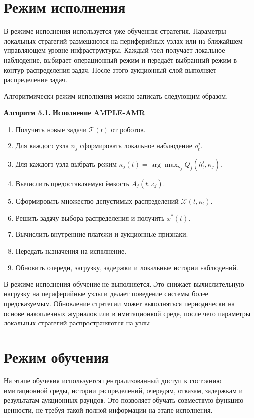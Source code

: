 \section{Режим исполнения}

В режиме исполнения используется уже обученная стратегия. Параметры локальных стратегий размещаются на периферийных узлах или на ближайшем управляющем уровне инфраструктуры. Каждый узел получает локальное наблюдение, выбирает операционный режим и передаёт выбранный режим в контур распределения задач. После этого аукционный слой выполняет распределение задач.

Алгоритмически режим исполнения можно записать следующим образом.

\textbf{Алгоритм 5.1. Исполнение AMPLE-AMR}
\begin{enumerate}
    \item Получить новые задачи $\mathcal{T}(t)$ от роботов.
    \item Для каждого узла $n_j$ сформировать локальное наблюдение $o^j_t$.
    \item Для каждого узла выбрать режим $\kappa_j(t)=\arg\max_{\kappa_j} Q_j(h^j_t,\kappa_j)$.
    \item Вычислить предоставляемую ёмкость $\overline{A}_j(t,\kappa_j)$.
    \item Сформировать множество допустимых распределений $\mathcal{X}(t,\kappa_t)$.
    \item Решить задачу выбора распределения и получить $x^*(t)$.
    \item Вычислить внутренние платежи и аукционные признаки.
    \item Передать назначения на исполнение.
    \item Обновить очереди, загрузку, задержки и локальные истории наблюдений.
\end{enumerate}

В режиме исполнения обучение не выполняется. Это снижает вычислительную нагрузку на периферийные узлы и делает поведение системы более предсказуемым. Обновление стратегии может выполняться периодически на основе накопленных журналов или в имитационной среде, после чего параметры локальных стратегий распространяются на узлы.

\section{Режим обучения}

На этапе обучения используется централизованный доступ к состоянию имитационной среды, истории распределений, очередям, отказам, задержкам и результатам аукционных раундов. Это позволяет обучать совместную функцию ценности, не требуя такой полной информации на этапе исполнения.


